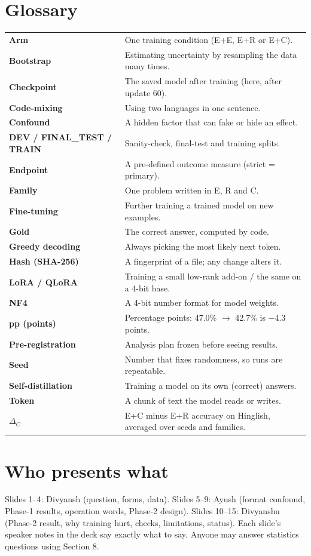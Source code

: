 \documentclass[11pt,a4paper]{article}
\begin{document}
\section{Glossary}
\small
\begin{tabularx}{\linewidth}{@{}>{\bfseries}p{3.4cm}X@{}}
Arm & One training condition (E+E, E+R or E+C).\\
Bootstrap & Estimating uncertainty by resampling the data many times.\\
Checkpoint & The saved model after training (here, after update 60).\\
Code-mixing & Using two languages in one sentence.\\
Confound & A hidden factor that can fake or hide an effect.\\
DEV / FINAL\_TEST / TRAIN & Sanity-check, final-test and training splits.\\
Endpoint & A pre-defined outcome measure (strict = primary).\\
Family & One problem written in E, R and C.\\
Fine-tuning & Further training a trained model on new examples.\\
Gold & The correct answer, computed by code.\\
Greedy decoding & Always picking the most likely next token.\\
Hash (SHA-256) & A fingerprint of a file; any change alters it.\\
LoRA / QLoRA & Training a small low-rank add-on / the same on a 4-bit base.\\
NF4 & A 4-bit number format for model weights.\\
pp (points) & Percentage points: 47.0\% $\to$ 42.7\% is $-4.3$ points.\\
Pre-registration & Analysis plan frozen before seeing results.\\
Seed & Number that fixes randomness, so runs are repeatable.\\
Self-distillation & Training a model on its own (correct) answers.\\
Token & A chunk of text the model reads or writes.\\
$\Delta_C$ & E+C minus E+R accuracy on Hinglish, averaged over seeds and families.\\
\end{tabularx}
\normalsize

\section{Who presents what}
Slides 1--4: Divyansh (question, forms, data). Slides 5--9: Ayush (format confound, Phase-1 results, operation words, Phase-2 design). Slides 10--15: Divyanshu (Phase-2 result, why training hurt, checks, limitations, status). Each slide's speaker notes in the deck say exactly what to say. Anyone may answer statistics questions using Section 8.

\newpage

\end{document}
